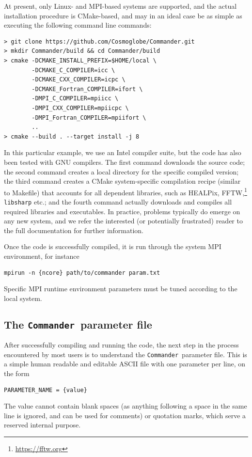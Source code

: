 \documentclass[twocolumn]{aa}
\def\commander{\texttt{Commander}}
\begin{document}
At present, only Linux- and MPI-based systems are supported, and the
actual installation procedure is CMake-based, and may in an ideal
case be as simple as executing the following command line commands:
{\small
\begin{verbatim}
> git clone https://github.com/Cosmoglobe/Commander.git 
> mkdir Commander/build && cd Commander/build
> cmake -DCMAKE_INSTALL_PREFIX=$HOME/local \
        -DCMAKE_C_COMPILER=icc \
        -DCMAKE_CXX_COMPILER=icpc \
        -DCMAKE_Fortran_COMPILER=ifort \
        -DMPI_C_COMPILER=mpiicc \
        -DMPI_CXX_COMPILER=mpiicpc \
        -DMPI_Fortran_COMPILER=mpiifort \
        ..
> cmake --build . --target install -j 8
\end{verbatim}
} In this particular example, we use an Intel compiler suite, but the
code has also been tested with GNU compilers. The first command
downloads the source code; the second command creates a local
directory for the specific compiled version; the third command creates
a CMake system-specific compilation recipe (similar to Makefile) that
accounts for all dependent libraries, such as
HEALPix,
FFTW,\footnote{\url{https://fftw.org}} \texttt{libsharp} etc.; and the
fourth command actually downloads and compiles all required libraries
and executables. In practice, problems typically do emerge on any new
system, and we refer the interested (or potentially frustrated) reader
to the full documentation for further information.

Once the code is successfully compiled, it is run through the system
MPI environment, for instance
\begin{verbatim}
mpirun -n {ncore} path/to/commander param.txt
\end{verbatim}
Specific MPI runtime environment parameters must be tuned according to
the local system.

\subsection{The \commander\ parameter file}

After successfully compiling and running the code, the next step in
the process encountered by most users is to understand the
\commander\ parameter file. This is a simple human readable and
editable ASCII file with one parameter per line, on the form
\begin{verbatim}
PARAMETER_NAME = {value}
\end{verbatim}
The value cannot contain blank spaces (as anything following a space
in the same line is ignored, and can be used for comments) or
quotation marks, which serve a reserved internal purpose.
\end{document}
